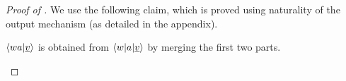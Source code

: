     \begin{proof}[Proof of ]
    We use the following claim, which is proved using naturality of the output mechanism (as detailed in the appendix).
    \begin{claim}\label{claim:merge-factorized-output}
        $\langle wa|\underline v \rangle$ is obtained from $\langle w|a|\underline v \rangle$ by merging the first two parts.
    \end{claim}


\end{proof}
